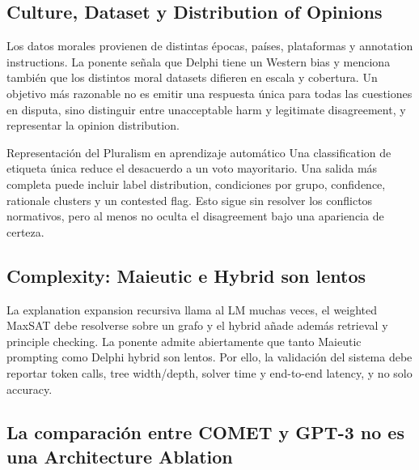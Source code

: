 \documentclass[a4paper]{article}
\begin{document}

\subsection{Culture, Dataset y Distribution of Opinions}

Los datos morales provienen de distintas épocas, países, plataformas y annotation instructions. La ponente señala que Delphi tiene un Western bias y menciona también que los distintos moral datasets difieren en escala y cobertura. Un objetivo más razonable no es emitir una respuesta única para todas las cuestiones en disputa, sino distinguir entre unacceptable harm y legitimate disagreement, y representar la opinion distribution.

\begin{knowledgebox}{Representación del Pluralism en aprendizaje automático}
Una classification de etiqueta única reduce el desacuerdo a un voto mayoritario. Una salida más completa puede incluir label distribution, condiciones por grupo, confidence, rationale clusters y un contested flag. Esto sigue sin resolver los conflictos normativos, pero al menos no oculta el disagreement bajo una apariencia de certeza.
\end{knowledgebox}

\subsection{Complexity: Maieutic e Hybrid son lentos}

La explanation expansion recursiva llama al LM muchas veces, el weighted MaxSAT debe resolverse sobre un grafo y el hybrid añade además retrieval y principle checking. La ponente admite abiertamente que tanto Maieutic prompting como Delphi hybrid son lentos. Por ello, la validación del sistema debe reportar token calls, tree width/depth, solver time y end-to-end latency, y no solo accuracy.

\subsection{La comparación entre COMET y GPT-3 no es una Architecture Ablation}
\end{document}
